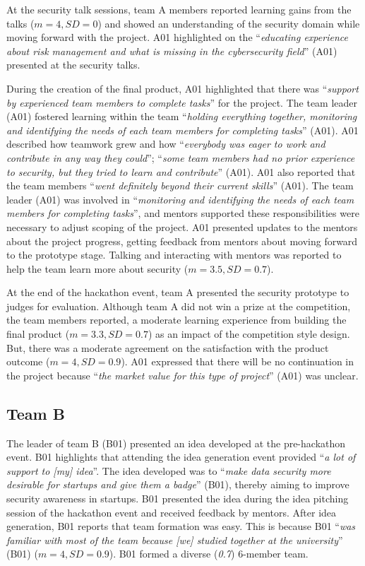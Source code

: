 \documentclass[runningheads]{llncs}
\begin{document}
At the security talk sessions, team A members reported learning gains from the talks ($m = 4,SD=0$) and showed an understanding of the security domain while moving forward with the project. A01 highlighted on the ``\textit{educating experience about risk management and what is missing in the cybersecurity field}'' (A01) presented at the security talks.

During the creation of the final product, A01 highlighted that there was ``\textit{support by experienced team members to complete tasks}'' for the project. The team leader (A01) fostered learning within the team ``\textit{holding everything together, monitoring and identifying the needs of each team members for completing tasks}'' (A01). A01 described how teamwork grew and how ``\textit{everybody was eager to work and contribute in any way they could}''; ``\textit{some team members had no prior experience to security, but they tried to learn and contribute}'' (A01). A01 also reported that the team members ``\textit{went definitely beyond their current skills}'' (A01). The team leader (A01) was involved in  ``\textit{monitoring and identifying the needs of each team members for completing tasks}'', and mentors supported these responsibilities were necessary to adjust scoping of the project. A01 presented updates to the mentors about the project progress, getting feedback from mentors about moving forward to the prototype stage. Talking and interacting with mentors was reported to help the team learn more about security ($m = 3.5,SD=0.7$).

At the end of the hackathon event, team A presented the security prototype to judges for evaluation. Although team A did not win a prize at the competition, the team members reported, a moderate learning experience from building the final product ($m = 3.3,SD=0.7$) as an impact of the competition style design. But, there was a moderate agreement on the satisfaction with the product outcome ($m=4, SD=0.9$). A01 expressed that there will be no continuation in the project because ``\textit{the market value for this type of project}'' (A01) was unclear.%

\subsection{Team B}
The leader of team B (B01) presented an idea developed at the pre-hackathon event. B01 highlights that attending the idea generation event provided ``\textit{a lot of support to [my] idea}''. The idea developed was to ``\textit{make data security more desirable for startups and give them a badge}'' (B01), thereby aiming to improve security awareness in startups. B01 presented the idea during the idea pitching session of the hackathon event and received feedback by mentors. 
After idea generation, B01 reports that team formation was easy. This is because B01 ``\textit{was familiar with most of the team because [we] studied together at the university}'' (B01) ($m=4, SD=0.9$). B01 formed a diverse (\textit{0.7}) 6-member team.
\end{document}
